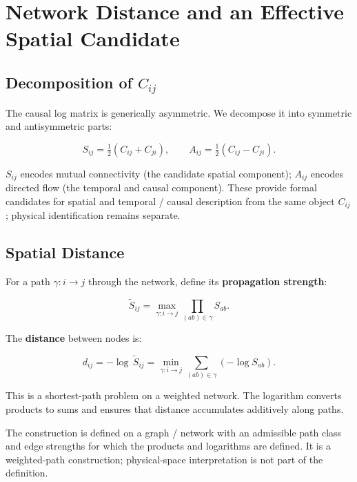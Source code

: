 \section{Network Distance and an Effective Spatial Candidate}
\label{sec:space}

\subsection{Decomposition of $C_{ij}$}

The causal log matrix is generically asymmetric.
We decompose it into symmetric and antisymmetric parts:

\begin{equation}
  S_{ij} = \tfrac{1}{2}(C_{ij} + C_{ji}),
  \qquad
  A_{ij} = \tfrac{1}{2}(C_{ij} - C_{ji}).
  \label{eq:decomp}
\end{equation}

$S_{ij}$ encodes mutual connectivity (the candidate spatial component);
$A_{ij}$ encodes directed flow (the temporal and causal component).
These provide formal candidates for spatial and temporal / causal description
from the same object $C_{ij}$; physical identification remains separate.

\subsection{Spatial Distance}

For a path $\gamma: i \to j$ through the network,
define its \textbf{propagation strength}:

\[
  \tilde{S}_{ij}
  = \max_{\gamma: i \to j} \prod_{(ab)\in\gamma} S_{ab}.
\]

The \textbf{distance} between nodes is:

\begin{keybox}
\begin{equation}
  d_{ij} = -\log\,\tilde{S}_{ij}
  = \min_{\gamma: i \to j} \sum_{(ab)\in\gamma} (-\log S_{ab}).
  \label{eq:distance}
\end{equation}
\end{keybox}

\noindent
This is a shortest-path problem on a weighted network.
The logarithm converts products to sums and ensures that distance accumulates
additively along paths.

The construction is defined on a graph / network with an admissible path
class and edge strengths for which the products and logarithms are defined.
It is a weighted-path construction; physical-space interpretation is not part
of the definition.

